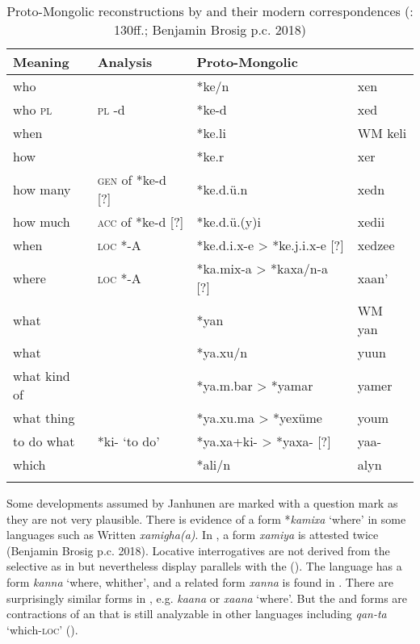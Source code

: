 \begin{table}
\caption{Proto-Mongolic reconstructions by \citet[20]{Janhunen2003a} and their modern  correspondences (\citealt{Janhunen2012c}: 130ff.; Benjamin Brosig p.c. 2018)}
\label{tab:mong:14}

\begin{tabularx}{\textwidth}{llQl}
\lsptoprule

\textbf{Meaning} & \textbf{Analysis} & \textbf{Proto-Mongolic} & \textbf{}\\
\midrule
who &  & *ke/n & xen\\
who \textsc{pl} & \textsc{pl} -d & *ke-d & xed\\
when & & *ke.li & WM keli\\
how &  & *ke.r & xer\\
how many & \textsc{gen} of *ke-d [?] & *ke.d.ü.n & xedn\\
how much & \textsc{acc} of *ke-d [?] & *ke.d.ü.(y)i & xedii\\
when & \textsc{loc} \textsc{*-A} & *ke.d.i.x-e > *ke.j.i.x-e [?] & xedzee\\
where & \textsc{loc} \textsc{*-A} & *ka.mix-a > *kaxa/n-a [?] & xaan’\\
what & & *yan & WM yan\\
what &  & *ya.xu/n & yuun\\
what kind of &  & *ya.m.bar > *yamar & yamer\\
what thing & & *ya.xu.ma > *yexüme & youm\\
to do what & *ki- ‘to do’ & *ya.xa+ki- > *yaxa- [?] & yaa-\\
which &  & *ali/n & alyn\\
\lspbottomrule
\end{tabularx}
\end{table}

Some developments assumed by Janhunen are marked with a question mark as they are not very plausible. There is evidence of a form *\textit{kamixa} ‘where’ in some languages such as Written  \textit{xamigha(a)}. In , a form \textit{xamiya} is attested twice (Benjamin Brosig p.c. 2018). Locative interrogatives are not derived from the selective  as in  but nevertheless display parallels with the  (). The  language  has a form \textit{kanna} ‘where, whither’, and a related form \textit{xanna} is found in . There are surprisingly similar forms in , e.g.  \textit{kaana} or  \textit{xaana} ‘where’. But the  and  forms are contractions of an  that is still analyzable in other  languages including  \textit{qan-ta} ‘which-\textsc{loc}’ ().

